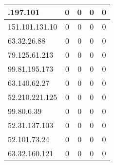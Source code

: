 \documentclass{article}
\begin{document}
\begin{longtable}{|>{\raggedright\arraybackslash}p{3cm}|c|c|c|c|}
    54.154.197.101 & 0 & 0 & 0 & 0 \\
    \hline
    
    
    \rowcolor{lightgreen} %
    
    151.101.131.10 & 0 & 0 & 0 & 0 \\
    \hline
    
    
    \rowcolor{lightgreen} %
    
    63.32.26.88 & 0 & 0 & 0 & 0 \\
    \hline
    
    
    \rowcolor{lightgreen} %
    
    79.125.61.213 & 0 & 0 & 0 & 0 \\
    \hline
    
    
    \rowcolor{lightgreen} %
    
    99.81.195.173 & 0 & 0 & 0 & 0 \\
    \hline
    
    
    \rowcolor{lightgreen} %
    
    63.140.62.27 & 0 & 0 & 0 & 0 \\
    \hline
    
    
    \rowcolor{lightgreen} %
    
    52.210.221.125 & 0 & 0 & 0 & 0 \\
    \hline
    
    
    \rowcolor{lightgreen} %
    
    99.80.6.39 & 0 & 0 & 0 & 0 \\
    \hline
    
    
    \rowcolor{lightgreen} %
    
    52.31.137.103 & 0 & 0 & 0 & 0 \\
    \hline
    
    
    \rowcolor{lightgreen} %
    
    52.101.73.24 & 0 & 0 & 0 & 0 \\
    \hline
    
    
    \rowcolor{lightgreen} %
    
    63.32.160.121 & 0 & 0 & 0 & 0 \\
    \hline
    

\end{longtable}
\end{document}
